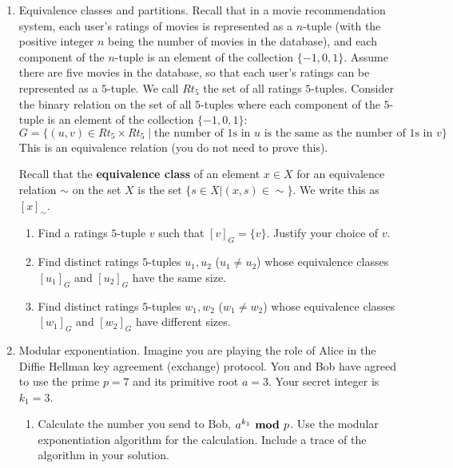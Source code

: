 \begin{enumerate}[labelindent=0pt, leftmargin=0pt]
    \item Equivalence classes and partitions. 
    Recall that 
    in a movie recommendation system, each 
    user's ratings of movies is represented as a $n$-tuple (with the positive integer $n$ 
    being the number of movies in the database), and each component of 
    the $n$-tuple is an element of the collection $\{-1,0,1\}$. Assume there are five movies in the database, 
    so that each user's ratings
    can be represented as a $5$-tuple. We call $Rt_5$ the set of all ratings $5$-tuples.
    Consider the binary relation on the  set of all 
    $5$-tuples where each  component of the $5$-tuple is an element of the collection $\{-1,0,1\}$:
    \[
        G = \{ (u,v) \in Rt_5 \times Rt_5 \mid \text{the number of $1$s in $u$ is the same as the number of $1$s in $v$} \}
    \]
    This is an equivalence relation (you do not need to prove this).

    Recall that the {\bf equivalence class} of an element $x \in X$ for an equivalence relation $\sim$ on the set $X$ 
    is the set $\{s \in X | (x, s) \in \sim \}$. We write this as $[x]_\sim$.
    
    \begin{enumerate}
        \item Find a ratings $5$-tuple $v$ such that $[v]_{G} = \{v \}$. Justify your choice of $v$.
        \item Find distinct ratings $5$-tuples $u_1, u_2$ ($u_1 \neq u_2$) whose equivalence classes $[u_1]_{G}$ and $[u_2]_{G}$ have the same size.
        \item Find distinct ratings $5$-tuples $w_1, w_2$ ($w_1 \neq w_2$) whose equivalence classes $[w_1]_{G}$ and $[w_2]_{G}$ have different sizes.
    \end{enumerate}


    \item Modular exponentiation.
    Imagine you are playing the role of Alice in the Diffie Hellman key agreement (exchange) protocol.  
    You and Bob have agreed to use the prime $p = 7$ and its primitive root $a = 3$.
    Your secret integer is $k_1 = 3$.
        
        \begin{enumerate}
        \item  
        Calculate the number you send to Bob, 
        $a^{k_1} \textrm{\bf ~mod~} p$.  Use the modular exponentiation algorithm
        for the calculation. Include a trace of the algorithm in your solution.

        
        

\end{enumerate}
\end{enumerate}
